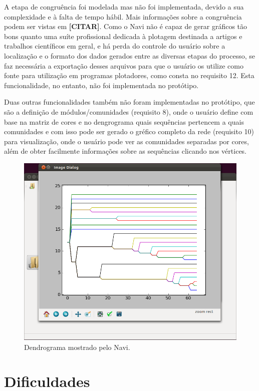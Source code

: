 A etapa de congruência foi modelada mas não foi implementada, devido a sua complexidade e à falta de tempo hábil. Mais informações sobre a congruência podem
ser vistas em \textbf{[CITAR]}. Como o Navi não é capaz de gerar gráficos tão bons quanto uma suíte profissional dedicada à plotagem destinada a artigos e
trabalhos científicos em geral, e há perda do controle do usuário sobre a localização e o formato dos dados gerados entre as diversas etapas do processo, se
faz necessária a exportação desses arquivos para que o usuário os utilize como fonte para utilização em programas plotadores, como consta no requisito
12. Esta funcionalidade, no entanto, não foi implementada no protótipo.

Duas outras funcionalidades também não foram implementadas no protótipo, que são a definição de módulos/comunidades (requisito 8), onde o usuário define
com base na matriz de cores e no dengrograma quais sequências pertencem a quais comunidades e com isso pode ser gerado o gréfico completo da rede (requisito
10) para visualização, onde o usuário pode ver as comunidades separadas por cores, além de obter facilmente informações sobre as sequências clicando nos
vértices.

\begin{figure}
\centering
\includegraphics[scale=0.38]{navi-dendrogram}
\caption{Dendrograma mostrado pelo Navi.}
\label{fig:navi-dendrogram}
\end{figure}

\section{Dificuldades} \label{sec:dificuldades}

